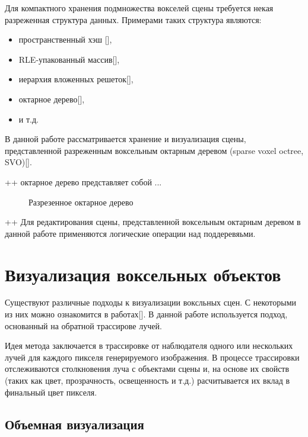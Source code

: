 \documentclass[a4paper,14pt]{extreport}
\begin{document}
Для компактного хранения подмножества вокселей сцены требуется некая разреженная структура данных. Примерами таких структура являются:

\begin{itemize}
\item пространственный хэш [],
\item RLE-упакованный массив[],
\item иерархия вложенных решеток[],
\item октарное дерево[], 
\item и т.д.
\end{itemize}

В данной работе рассматривается хранение и визуализация сцены, представленной разреженным воксельным октарным деревом (sparse voxel octree, SVO)[]. 

++ октарное дерево представляет собой ...

\begin{figure}[h]
  \begin{center}
  \end{center}
  \caption{Разрезенное октарное дерево}
  \label{fig:svo}
\end{figure}

++ Для редактирования сцены, представленной воксельным октарным деревом в данной работе применяются логические операции над поддеревяьми.

\section{Визуализация воксельных объектов}

Существуют различные подходы к визуализации воксльных сцен.  С некоторыми из них можно ознакомится в работах[]. В данной работе используется подход, основанный на обратной трассирове лучей.

Идея метода заключается в трассировке от наблюдателя одного или нескольких лучей для каждого пикселя генерируемого изображения. В процессе трассировки отслеживаются столкновения луча с объектами сцены и, на основе их свойств (таких как цвет, прозрачность, освещенность и т.д.)  расчитывается их вклад в финальный цвет пикселя.

\subsection{Объемная визуализация}
\end{document}
